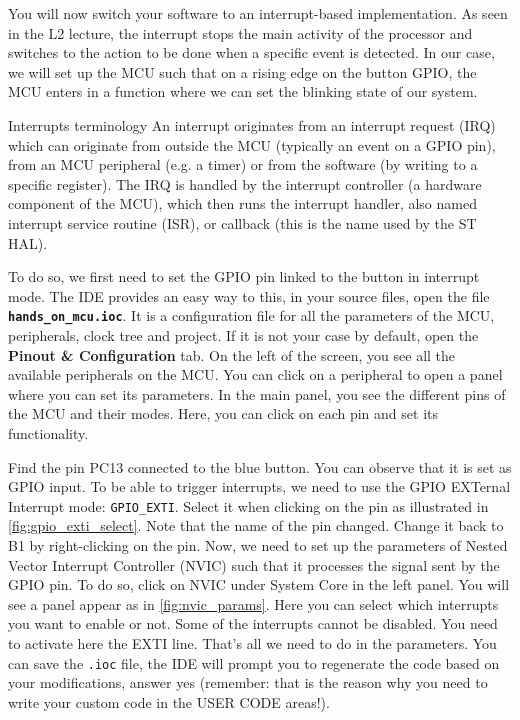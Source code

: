 You will now switch your software to an interrupt-based implementation. As seen in the L2 lecture, the interrupt stops the main activity of the processor and switches to the action to be done when a specific event is detected. In our case, we will set up the MCU such that on a rising edge on the button GPIO, the MCU enters in a function where we can set the blinking state of our system.

\begin{bclogo}[couleur = gray!20, arrondi = 0.2, logo=\bcinfo]{Interrupts terminology}
An interrupt originates from an interrupt request (IRQ) which can originate from outside the MCU (typically an event on a GPIO pin), from an MCU peripheral (e.g. a timer) or from the software (by writing to a specific register). The IRQ is handled by the interrupt controller (a hardware component of the MCU), which then runs the interrupt handler, also named interrupt service routine (ISR), or callback (this is the name used by the ST HAL).
\end{bclogo}

To do so, we first need to set the GPIO pin linked to the button in interrupt mode. The IDE provides an easy way to this, in your source files, open the file \textbf{\texttt{hands\_on\_mcu.ioc}}. It is a configuration file for all the parameters of the MCU, peripherals, clock tree and project. If it is not your case by default, open the \textbf{Pinout \& Configuration} tab. On the left of the screen, you see all the available peripherals on the MCU. You can click on a peripheral to open a panel where you can set its parameters. In the main panel, you see the different pins of the MCU and their modes. Here, you can click on each pin and set its functionality.

Find the pin PC13 connected to the blue button. You can observe that it is set as GPIO input. To be able to trigger interrupts, we need to use the GPIO EXTernal Interrupt mode: \texttt{GPIO\_EXTI}. Select it when clicking on the pin as illustrated in \autoref{fig:gpio_exti_select}. Note that the name of the pin changed. Change it back to B1 by right-clicking on the pin. Now, we need to set up the parameters of Nested Vector Interrupt Controller (NVIC) such that it processes the signal sent by the GPIO pin. To do so, click on NVIC under System Core in the left panel. You will see a panel appear as in \autoref{fig:nvic_params}. Here you can select which interrupts you want to enable or not. Some of the interrupts cannot be disabled. You need to activate here the EXTI line. That's all we need to do in the parameters. You can save the \texttt{.ioc} file, the IDE will prompt you to regenerate the code based on your modifications, answer yes (remember: that is the reason why you need to write your custom code in the USER CODE areas!).

